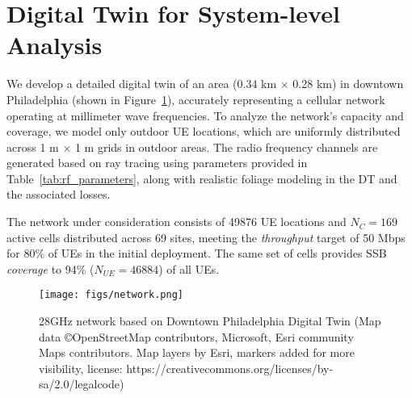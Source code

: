 \section{Digital Twin for System-level Analysis}
\label{sec:sim}

We develop a detailed digital twin of an area (0.34 km $\times$ 0.28 km) in downtown Philadelphia (shown in Figure~\ref{fig:network}), accurately representing a cellular network operating at millimeter wave frequencies. 
To analyze the network's capacity and coverage, we model only outdoor UE locations, which are uniformly distributed across 1 m $\times$ 1 m grids in outdoor areas.
The radio frequency channels are generated based on ray tracing using parameters provided in Table~\ref{tab:rf_parameters}, along with realistic foliage modeling in the DT and the associated losses. 

The network under consideration consists of 49876 UE locations and $N_C=169$ active cells distributed across 69 sites, meeting the \emph{throughput} target of 50 Mbps for 80\% of UEs in the initial deployment. The same set of cells provides SSB \emph{coverage} to 94\% ($N_{UE}=46884$) of all UEs.

\begin{figure}
\centering
\texttt{[image: figs/network.png]}
\caption{28GHz network based on Downtown Philadelphia Digital Twin \small{(Map data \copyright  OpenStreetMap contributors, Microsoft, Esri community Maps contributors. Map layers by Esri, markers added for more visibility, license: https://creativecommons.org/licenses/by-sa/2.0/legalcode)}}
    \label{fig:network}
    \vspace{-15pt}
\end{figure}

